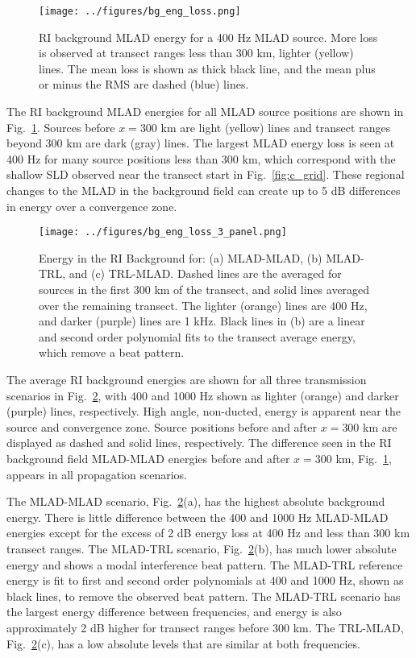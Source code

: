 \documentclass[preprint,NumberedRefs]{JASA}
\begin{document}
\begin{figure}
\texttt{[image: ../figures/bg\_eng\_loss.png]}
    \caption{RI background MLAD energy for a 400 Hz MLAD source. More loss is observed at transect ranges less than 300 km, lighter (yellow) lines. The mean loss is shown as thick black line, and the mean plus or minus the RMS are dashed (blue) lines.}
    \label{fig:bg_eng}
\end{figure}
The RI background MLAD energies for all MLAD source positions are shown in Fig.~\ref{fig:bg_eng}. Sources before $x=$300 km are light (yellow) lines and transect ranges beyond 300 km are dark (gray) lines. The largest MLAD energy loss is seen at 400 Hz for many source positions less than 300 km, which correspond with the shallow SLD observed near the transect start in Fig.~\ref{fig:c_grid}. These regional changes to the MLAD in the background field can create up to 5 dB differences in energy over a convergence zone.

\begin{figure}
\texttt{[image: ../figures/bg\_eng\_loss\_3\_panel.png]}
        \caption{Energy in the RI Background for: (a) MLAD-MLAD, (b) MLAD-TRL, and (c) TRL-MLAD. Dashed lines are the averaged for sources in the first 300 km of the transect, and solid lines averaged over the remaining transect. The lighter (orange) lines are 400 Hz, and darker (purple) lines are 1 kHz. Black lines in (b) are a linear and second order polynomial fits to the transect average energy, which remove a beat pattern.}
    \label{fig:eng_bg_3}
\end{figure}
The average RI background energies are shown for all three transmission scenarios in Fig.~\ref{fig:eng_bg_3}, with 400 and 1000 Hz shown as lighter (orange) and darker (purple) lines, respectively. High angle, non-ducted, energy is apparent near the source and convergence zone. Source positions before and after $x=300$ km are displayed as dashed and solid lines, respectively. The difference seen in the RI background field MLAD-MLAD energies before and after $x=300$ km, Fig.~\ref{fig:bg_eng}, appears in all propagation scenarios.

The MLAD-MLAD scenario, Fig.~\ref{fig:eng_bg_3}(a), has the highest absolute background energy. There is little difference between the 400 and 1000 Hz MLAD-MLAD energies except for the excess of 2 dB energy loss at 400 Hz and less than 300 km transect ranges. The MLAD-TRL scenario, Fig.~\ref{fig:eng_bg_3}(b), has much lower absolute energy and shows a modal interference beat pattern. The MLAD-TRL reference energy is fit to first and second order polynomials at 400 and 1000 Hz, shown as black lines, to remove the observed beat pattern. The MLAD-TRL scenario has the largest energy difference between frequencies, and energy is also approximately 2 dB higher for transect ranges before 300 km. The TRL-MLAD, Fig.~\ref{fig:eng_bg_3}(c), has a low absolute levels that are similar at both frequencies.
\end{document}
